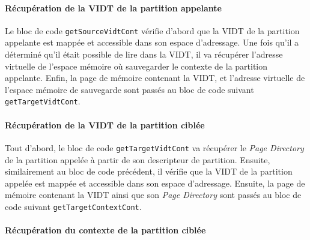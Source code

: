 		\paragraph{Récupération de la VIDT de la partition appelante}
		\label{sec:getSourceVidtCont}

		Le bloc de code \texttt{getSourceVidtCont} vérifie d'abord que la VIDT de la partition appelante est mappée et accessible dans son espace d'adressage. Une fois qu'il a déterminé qu'il était possible de lire dans la VIDT, il va récupérer l'adresse virtuelle de l'espace mémoire où sauvegarder le contexte de la partition appelante. Enfin, la page de mémoire contenant la VIDT, et l'adresse virtuelle de l'espace mémoire de sauvegarde sont passés au bloc de code suivant \texttt{getTargetVidtCont}.


		\paragraph{Récupération de la VIDT de la partition ciblée}
		\label{sec:getTargetVidtCont}
		Tout d'abord, le bloc de code \texttt{getTargetVidtCont} va récupérer le \emph{Page Directory} de la partition appelée à partir de son descripteur de partition. Ensuite, similairement au bloc de code précédent, il vérifie que la VIDT de la partition appelée est mappée et accessible dans son espace d'adressage. Ensuite, la page de mémoire contenant la VIDT ainsi que son \emph{Page Directory} sont passés au bloc de code suivant \texttt{getTargetContextCont}.

		\paragraph{Récupération du contexte de la partition ciblée}

